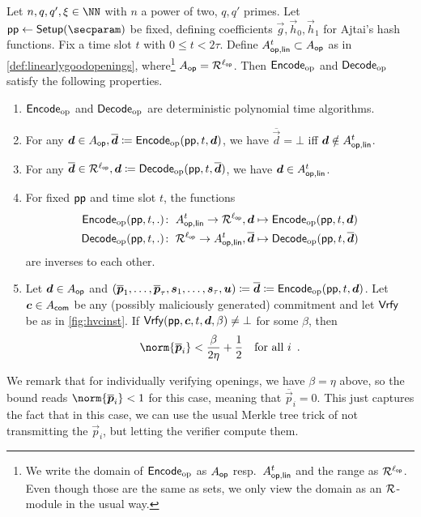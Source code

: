 
\begin{theorem}\label{thm:EncodingOfOpenings}
Let $n,q,q',\xi\in\NN$ with $n$ a power of two, $q,q'$ primes.
Let $\params\gets\setup(\secparam)$ be fixed, defining coefficients $\vec{g},\vec{h}_0,\vec{h}_1$ for Ajtai's hash functions.
Fix a time slot $t$ with $0\leq t < 2\tau$.
Define $A_{\mathsf{op,lin}}^{t}\subset A_{\mathsf{op}}$ as in \autoref{def:linearlygoodopenings}, where\footnote{We write the domain of $\mathsf{Encode}_{\mathrm{op}}$ as $A_{\mathsf{op}}$ resp.\ $A_{\mathsf{op,lin}}^{t}$ and the range as $\mathcal{R}^{\ell_{\mathsf{op}}}$. Even though those are the same as sets, we only view the domain as an $\mathcal{R}$-module in the usual way.} $A_{\mathsf{op}} = \mathcal{R}^{\ell_{\mathsf{op}}}$.
Then $\mathsf{Encode}_{\mathrm{op}}$ and $\mathsf{Decode}_{\mathrm{op}}$ satisfy the following properties.
\begin{enumerate}
 \item $\mathsf{Encode}_{\mathrm{op}}$ and $\mathsf{Decode}_{\mathrm{op}}$ are deterministic polynomial time algorithms. \label{item:openencodeispt}
 \item For any $\boldsymbol{d}\in A_{\mathsf{op}},\overline{\boldsymbol{d}} \coloneqq \mathsf{Encode}_{\mathrm{op}}(\mathsf{pp},t, \boldsymbol{d})$, we have $\overline{\vec{d}} = \bot$ iff $\boldsymbol{d}\notin A_{\mathsf{op,lin}}^{t}$.\label{item:openencodeworks}
 \item For any $\overline{\boldsymbol{d}}\in\mathcal{R}^{\ell_{\mathsf{op}}}, \boldsymbol{d}\coloneqq \mathsf{Decode}_{\mathrm{op}}(\mathsf{pp},t, \overline{\boldsymbol{d}})$, we have $\boldsymbol{d}\in A_{\mathsf{op,lin}}^{t}$. \label{item:opendecodeworks}
 \item For fixed $\mathsf{pp}$ and time slot $t$, the functions 
 \begin{align*}
 \mathsf{Encode}_{\mathrm{op}}(\mathsf{pp}, t, .)\colon\;A_{\mathsf{op,lin}}^{t} \to \mathcal{R}^{\ell_{\mathsf{op}}}&, \boldsymbol{d}\mapsto \mathsf{Encode}_{\mathrm{op}}(\mathsf{pp},t, \boldsymbol{d})\\
 \mathsf{Decode}_{\mathrm{op}}(\mathsf{pp}, t, .)\colon\;\mathcal{R}^{\ell_{\mathsf{op}}} \to A_{\mathsf{op,lin}}^{t}&, \overline{\boldsymbol{d}}\mapsto \mathsf{Decode}_{\mathrm{op}}(\mathsf{pp},t, \overline{\boldsymbol{d}})
 \end{align*}
are inverses to each other.\label{item:openencodeinverse}
\item Let $\boldsymbol{d}\in A_{\mathsf{op}}$ and $(\overline{\boldsymbol{p}}_1,\ldots,\overline{\boldsymbol{p}}_\tau,\boldsymbol{s}_1,\ldots,\boldsymbol{s}_\tau,\boldsymbol{u}) \coloneqq \overline{\boldsymbol{d}}\coloneqq \mathsf{Encode}_{\mathrm{op}}(\mathsf{pp},t, \boldsymbol{d})$. Let $\boldsymbol{c}\in A_{\mathsf{com}}$ be any (possibly maliciously generated) commitment and let $\mathsf{Vrfy}$ be as in \autoref{fig:hvcinst}. If $\mathsf{Vrfy}(\mathsf{pp}, \boldsymbol{c}, t,\boldsymbol{d}, \beta) \neq \bot$ for some $\beta$, then \label{item:openencodebounds}
\[
 \norm{\overline{\vec{p}}_i} < \frac{\beta}{2\eta} + \frac12\quad\text{for all $i$}\enspace.
\]
\end{enumerate}
We remark that for individually verifying openings, we have $\beta=\eta$ above, so the bound reads $\norm{\overline{\vec{p}}_i} < 1$ for this case, meaning that $\overline{\vec{p}}_i = 0$.
This just captures the fact that in this case, we can use the usual Merkle tree trick of not transmitting the $\vec{p}_i$, but letting the verifier compute them.
\end{theorem}
